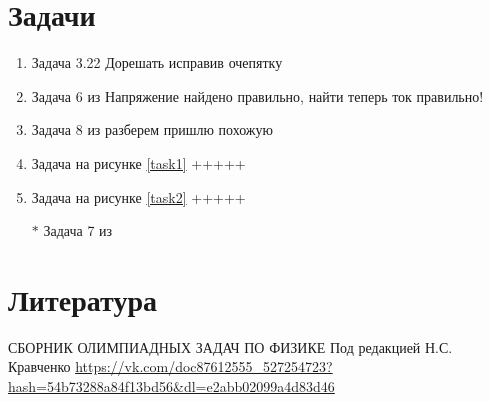 \documentclass[a4paper,12pt]{article} %
\begin{document}
\section{Задачи}
\begin{enumerate}
\item Задача 3.22 \cite{l1} \colorbox{BrickRed}{Дорешать исправив очепятку}

\item  Задача 6 из \cite{l2}  \colorbox{BrickRed}{Напряжение найдено правильно, найти теперь ток правильно!}

\item  Задача 8 из \cite{l2}  \colorbox{BrickRed}{разберем пришлю похожую}

\item Задача на рисунке \ref{task1} \colorbox{BrickRed}{+++++}

\item Задача на рисунке \ref{task2} \colorbox{BrickRed}{+++++}


\item[$\ast$] Задача 7 из \cite{l2}

\end{enumerate}

\section{Литература}
\begin{thebibliography}{}
     СБОРНИК ОЛИМПИАДНЫХ ЗАДАЧ ПО ФИЗИКЕ Под редакцией Н.С. Кравченко
     \url{https://vk.com/doc87612555_527254723?hash=54b73288a84f13bd56&dl=e2abb02099a4d83d46}
	
\end{thebibliography}
\end{document}
